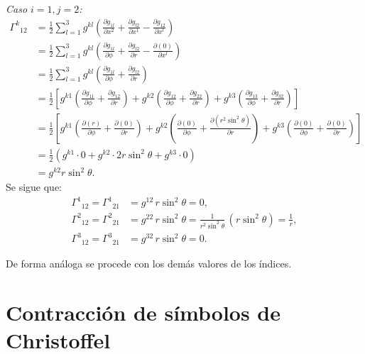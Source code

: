 \documentclass[../apunte_mecanica_clasica.tex]{subfiles}%
\begin{document}
\begin{apuntebloque}{}
\textit{Caso $i=1, j=2$:}
\begin{align*}
    \Gamma^k{}_{12} 
    &= \frac{1}{2} \sum_{l=1}^3 g^{kl}
    \left( \frac{\partial g_{1l}}{\partial x^2}
         + \frac{\partial g_{l2}}{\partial x^1}
         - \frac{\partial g_{12}}{\partial x^l} \right) \\[6pt]
    &= \frac{1}{2} \sum_{l=1}^3 g^{kl}
    \left( \frac{\partial g_{1l}}{\partial \phi}
         + \frac{\partial g_{l2}}{\partial r}
         - \frac{\partial (0)}{\partial x^l} \right) \\[6pt]
    &= \frac{1}{2} \sum_{l=1}^3 g^{kl}
    \left( \frac{\partial g_{1l}}{\partial \phi}
         + \frac{\partial g_{l2}}{\partial r}\right) \\[6pt]
    &= \frac{1}{2} \left[  g^{k1}\left(\frac{\partial g_{11}}{\partial \phi}
         + \frac{\partial g_{12}}{\partial r}\right) 
         + g^{k2}\left(\frac{\partial g_{12}}{\partial \phi}
         + \frac{\partial g_{22}}{\partial r}\right)
         + g^{k3}\left(\frac{\partial g_{13}}{\partial \phi}
         + \frac{\partial g_{32}}{\partial r}\right)\right] \\[6pt]
    &= \frac{1}{2} \left[  g^{k1}\left(\frac{\partial (r)}{\partial \phi}
         + \frac{\partial (0)}{\partial r}\right) 
         + g^{k2}\left(\frac{\partial (0)}{\partial \phi}
         + \frac{\partial (r^2\sin^2\theta)}{\partial r}\right)
         + g^{k3}\left(\frac{\partial (0)}{\partial \phi}
         + \frac{\partial (0)}{\partial r}\right)\right] \\[6pt]
    &= \frac{1}{2} \left(  g^{k1}\cdot0 
         + g^{k2}\cdot2r\sin^2\theta
         + g^{k3}\cdot0\right) \\[6pt]
         &= g^{k2}r\sin^2\theta .
\end{align*}
Se sigue que:
\begin{align*}
    \Gamma^1{}_{12} = \Gamma^1{}_{21} &= g^{12}\, r\sin^2\theta = 0, \\[6pt]
    \Gamma^2{}_{12} = \Gamma^2{}_{21} &= g^{22}\, r\sin^2\theta 
    = \frac{1}{r^2\sin^2\theta}\,(r\sin^2\theta) 
    = \frac{1}{r}, \\[6pt]
    \Gamma^3{}_{12} = \Gamma^3{}_{21} &= g^{32}\, r\sin^2\theta = 0.
\end{align*}

\medskip
De forma análoga se procede con los demás valores de los índices.

\end{apuntebloque}


\section{Contracción de símbolos de Christoffel}
\end{document}
